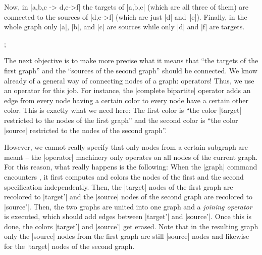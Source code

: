 Now, in |{a,b,c} -> {d,e->f}| the targets  of |{a,b,c}| (which are all three of
them) are connected to the sources of |{d,e->f}| (which are just |d| and~|e|).
Finally, in the whole graph only |a|, |b|, and |c| are sources while only  |d|
and |f| are targets.
%
\begin{codeexample}[preamble={\usetikzlibrary{graphs}}]
\def\hilightsource#1{\fill [green, opacity=.25] (#1) circle [radius=2mm]; }
\def\hilighttarget#1{\fill [red,   opacity=.25] (#1) circle [radius=2mm]; }
\tikz {};
\end{codeexample}

The next objective is to make more precise what it means that ``the targets of
the first graph'' and the ``sources of the second graph'' should be connected.
We know already of a general way of connecting nodes of a graph: operators!
Thus, we use an operator for this job. For instance, the |complete bipartite|
operator adds an edge from every node having a certain color to every node have
a certain other color. This is exactly what we need here: The first color is
``the color |target| restricted to the nodes of the first graph'' and the
second color is ``the color |source| restricted to the nodes of the second
graph''.

However, we cannot really specify that only nodes from a certain subgraph are
meant -- the |operator| machinery only operates on all nodes of the current
graph. For this reason, what really happens is the following: When the |graph|
command encounters   ,
it first computes and colors the nodes of the first and the second
specification independently. Then, the |target| nodes of the first graph are
recolored to |target'| and the |source| nodes of the second graph are recolored
to |source'|. Then, the two graphs are united into one graph and a
\emph{joining operator} is executed, which should add edges between |target'|
and |source'|. Once this is done, the colors |target'| and |source'| get
erased. Note that in the resulting graph only the |source| nodes from the first
graph are still |source| nodes and likewise for the |target| nodes of the
second graph.

